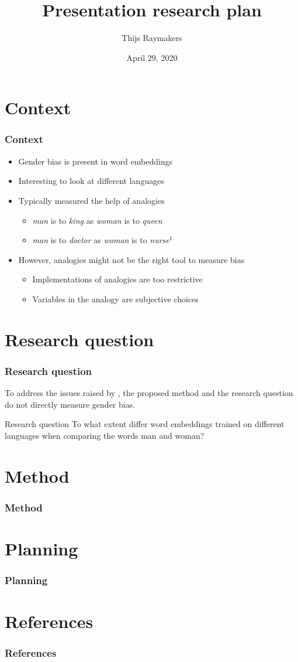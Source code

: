 \documentclass{beamer}
\author{Thijs Raymakers}
\title{Presentation research plan}
\date{April 29, 2020}
\begin{document}
\section{Context}
\begin{frame}
\frametitle{Context}
\begin{itemize}
    \item Gender bias is present in word embeddings~
    \pause
    \item Interesting to look at different languages
    \pause
    \item Typically measured the help of analogies
    \begin{itemize}
        \item \textit{man} is to \textit{king} as \textit{woman} is to \textit{queen}
        \item \textit{man} is to \textit{doctor} as \textit{woman} is to \textit{nurse}$^1$
    \end{itemize}
    \pause
    \item However, analogies might not be the right tool to measure bias 
    \begin{itemize}
        \item Implementations of analogies are too restrictive
        \item Variables in the analogy are subjective choices
    \end{itemize}
\end{itemize}
\end{frame}

\section{Research question}
\begin{frame}
\frametitle{Research question}
To address the issues raised by \textcite{2019arXiv190509866N}, the proposed method
and the research question do not directly measure gender bias.
\newline
\pause
\begin{block}{Research question}
To what extent differ word embeddings trained on different languages when comparing
the words man and woman?
\end{block}
\end{frame}

\section{Method}
\begin{frame}
\frametitle{Method}
\end{frame}

\section{Planning}
\begin{frame}
\frametitle{Planning}
\end{frame}

\section{References}
\begin{frame}
\frametitle{References}
\printbibliography[heading=none]
\end{frame}
\end{document}

